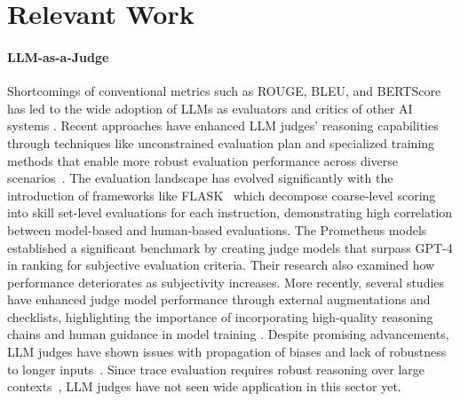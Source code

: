\section{Relevant Work}


\paragraph{LLM-as-a-Judge} 
Shortcomings of conventional metrics such as ROUGE, BLEU, and BERTScore~\cite{schluter-2017-limits, freitag-etal-2020-bleu, hanna-bojar-2021-fine} has led to the wide adoption of LLMs as evaluators and critics of other AI systems \cite{zheng2023judging, zhu2025judgelm, chen2025judgelrm, chen2024mllmjudge, kim-etal-2024-prometheus}. Recent approaches have enhanced LLM judges' reasoning capabilities through techniques like unconstrained evaluation plan and specialized training methods that enable more robust evaluation performance across diverse scenarios~\cite{lightman2023lets, wang2024helpsteer2, trivedi2024selfrationalization, saha2025learning}. The evaluation landscape has evolved significantly with the introduction of frameworks like FLASK~\cite{ye2023flask} which decompose coarse-level scoring into skill set-level evaluations for each instruction, demonstrating high correlation between model-based and human-based evaluations. The Prometheus models \cite{kim2023prometheus, kim-etal-2024-prometheus, kim-etal-2025-biggen} established a significant benchmark by creating judge models that surpass GPT-4 in ranking for subjective evaluation criteria. Their research also examined how performance deteriorates as subjectivity increases. More recently, several studies have enhanced judge model performance through external augmentations and checklists, highlighting the importance of incorporating high-quality reasoning chains and human guidance in model training \cite{lee2025checkeval, deshpande-etal-2024-contextualizing, deshpande2024glider, chen2025judgelrm, wang2025mcts}. Despite promising advancements, LLM judges have shown issues with propagation of biases and lack of robustness to longer inputs~\cite{ye2024justice, hu2024rethinking, wei2024systematic, zhou2025evaluating}. Since trace evaluation requires robust reasoning over large contexts~\cite{tian-etal-2024-debugbench}, LLM judges have not seen wide application in this sector yet.


